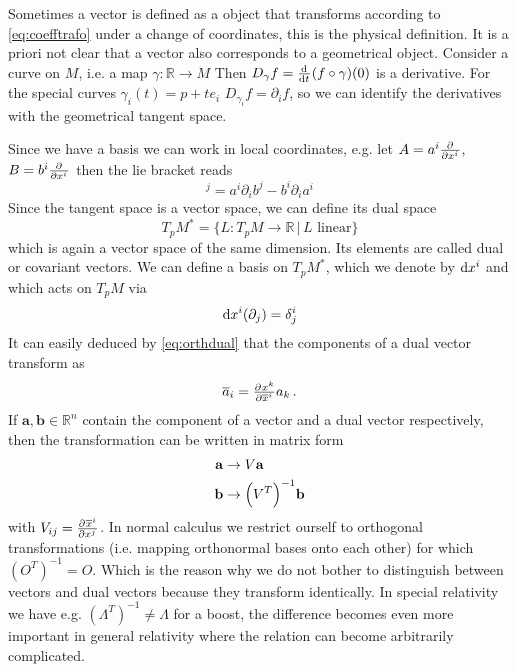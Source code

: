 \documentclass[
    a4paper,                                               %
    oneside,                                               %
    12pt,                                                  %
    headsepline,                                           %
    xcolor=dvipsnames
    ]{scrreprt}
\theoremstyle{definition}
\theoremstyle{remark}
\let\originalleft\left
\let\originalright\right
\renewcommand{\left}{\mathopen{}\mathclose\bgroup\originalleft}
\renewcommand{\right}{\aftergroup\egroup\originalright}
\renewcommand{\vec}{\mathbf}
\begin{document}
	     Sometimes a vector is defined as a object that transforms according to \ref{eq:coefftrafo} under a change of coordinates, this is the physical definition. It is a priori not clear that a vector also corresponds to a geometrical object. Consider a curve on $M$, i.e. a map $\gamma:\mathbb{R}\to M$
	     Then $D_\gamma f=\od{}{t}(f\circ\gamma)(0)$ is a derivative.
	     For the special curves $\gamma_i(t)=p+te_i$
	     $D_{\gamma_i} f=\partial_if$, so we can identify the derivatives with the geometrical tangent space.\par
	     Since we have a basis we can work in local coordinates, e.g. let $A=a^i\pd{}{{x^i}}$, $B=b^i\pd{}{{x^i}}$ then the lie bracket reads 
	     \begin{equation}
	     	[A,B]^j=a^i\partial_ib^j-b^i\partial_ia^i
	     \end{equation}
	     Since the tangent space is a vector space, we can define its dual space
	     \begin{equation}
			T_pM^*=\{L:T_pM\to \mathbb{R}\, |\, L \text{ linear}\}
	     \end{equation} 
	     which is again a vector space of the same dimension. Its elements are called dual or covariant vectors.
	     We can define a basis on $	T_pM^*$, which we denote by $\dif x^i$ and  which acts on $T_pM$ via
	     \begin{equation}
	     	\dif x^i(\partial_j)=\delta^i_j\label{eq:orthdual}
	     \end{equation}
	     It can easily deduced by \eqref{eq:orthdual} that the components of a dual vector transform as
	     \begin{equation}
	     	\overline{a}_i=\pd{x^k}{{\overline{x}^i}}a_k\, .
	     \end{equation}
	     If $\vec{a},\vec{b}\in\mathbb{R}^n$ contain the component of a vector and a dual vector respectively, then the transformation can be written in matrix form
	     \begin{align*}
	     	\vec{a}&\to V\vec{a}\\
	     	\vec{b}&\to\left(V^T\right)^{-1}\vec{b}
	     \end{align*} 
	     with $V_{ij}=\pd{\overline{x}^i}{{x^j}}$. In normal calculus we restrict ourself to orthogonal transformations (i.e. mapping orthonormal bases onto each other) for which $(O^T)^{-1}=O$. Which is the reason why we do not bother to distinguish between vectors and dual vectors because they transform identically. In special relativity we have e.g. $(\Lambda^T)^{-1}\neq\Lambda$ for a boost, the difference becomes even more important in general relativity where the relation can become arbitrarily complicated. 
\end{document}
